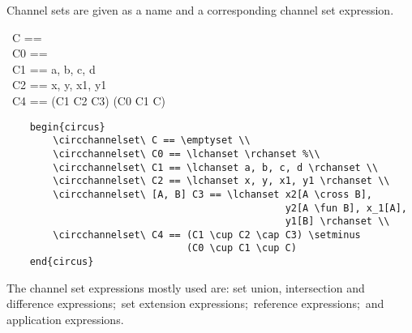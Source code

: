\documentclass{article}
\begin{document}
Channel sets are given as a name and a corresponding channel set expression.
%
\begin{circus}
    \circchannelset\ C == \emptyset \\
    \circchannelset\ C0 == \lchanset \rchanset \\
    \circchannelset\ C1 == \lchanset a, b, c, d \rchanset \\
    \circchannelset\ C2 == \lchanset x, y, x1, y1 \rchanset \\
    \circchannelset\ C4 == (C1 \cup C2 \cap C3) \setminus (C0 \cup C1 \cup C)
\end{circus}%
%
\begin{verbatim}
    begin{circus}
        \circchannelset\ C == \emptyset \\
        \circchannelset\ C0 == \lchanset \rchanset %\\
        \circchannelset\ C1 == \lchanset a, b, c, d \rchanset \\
        \circchannelset\ C2 == \lchanset x, y, x1, y1 \rchanset \\
        \circchannelset\ [A, B] C3 == \lchanset x2[A \cross B],
                                                y2[A \fun B], x_1[A],
                                                y1[B] \rchanset \\
        \circchannelset\ C4 == (C1 \cup C2 \cap C3) \setminus
                               (C0 \cup C1 \cup C)
    end{circus}
\end{verbatim}
%
The channel set expressions mostly used are: set union, intersection and
difference expressions;~set extension expressions;~reference expressions;~and
application expressions.
\end{document}

